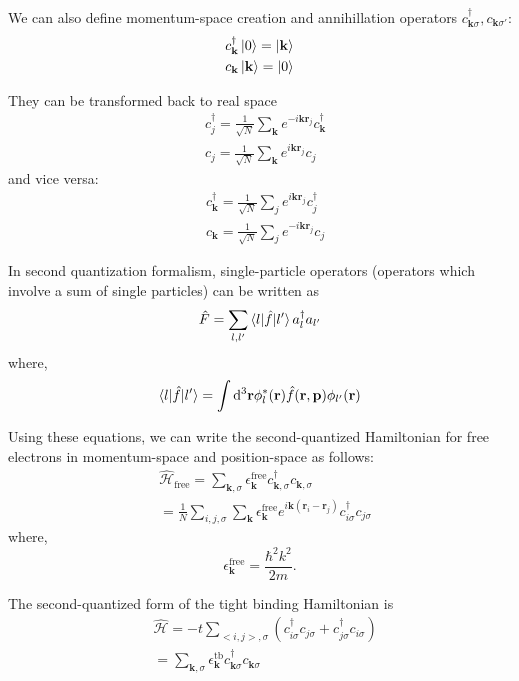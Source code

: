 \documentclass[11pt, a4paper, twocolumn]{article}
\newcommand{\bb}[1]{\mathbf{#1}}
\newcommand{\dd}{\mathrm{d}}
\begin{document}
\par We can also define momentum-space creation and annihillation operators $c^\dagger_{\bb k \sigma},
c_{\bb k \sigma'}$:
\begin{align*}
  &c^\dagger_{\bb k}\ket 0 = \ket {\bb k} \\
  &c_{\bb k}\ket {\bb k} = \ket 0
\end{align*}

They can be transformed back to real space
\begin{align*}
  &c^\dagger_j = \frac{1}{\sqrt N}\sum\limits_{\bb k}e^{-i\bb k \bb r_j}c^\dagger_{\bb k} \\
  &c_j = \frac{1}{\sqrt N}\sum\limits_{\bb k}e^{i\bb k \bb r_j}c_j
\end{align*}
and vice versa:
\begin{align*}
  &c^\dagger_{\bb k} = \frac{1}{\sqrt N}\sum\limits_{j}e^{i\bb k \bb r_j} c^\dagger_j \\
  &c_{\bb k} = \frac{1}{\sqrt N}\sum\limits_{j}e^{-i\bb k \bb r_j} c_j
\end{align*}

In second quantization formalism, single-particle operators (operators which involve a sum of single particles)
can be written as 
\begin{equation*}
  \hat F = \sum\limits_{l,l'} \braket{l | \hat f | l'}a^\dagger_{l}a_{l'}
\end{equation*}
where,
\begin{equation*}
  \braket{l | \hat f | l'} = \int \dd^3\bb r \phi^{*}_{l}(\bb r) \hat f(\bb r, \bb p) \phi_{l'}(\bb r)
\end{equation*}

Using these equations, we can write the second-quantized Hamiltonian for free electrons in 
momentum-space and position-space as follows:
\begin{align*}
  &\hat{\mathcal H}_{\textrm{free}} = \sum\limits_{\bb k, \sigma}\epsilon^{\textrm{free}}_{\bb k} c^\dagger_{\bb k, \sigma}
  c_{\bb k, \sigma} \\
  &=\frac{1}{N}\sum\limits_{i,j,\sigma}\sum\limits_{\bb k} \epsilon^{\textrm{free}}_{\bb k} 
  e^{i \bb k (\bb r_i - \bb r_j)} c^\dagger_{i\sigma}c_{j\sigma}
\end{align*} 
where, 
\begin{equation*}
  \epsilon^{\textrm{free}}_{\bb k} = \frac{\hbar^2k^2}{2m}\text{.}
\end{equation*}

The second-quantized form of the tight binding Hamiltonian is 
\begin{align*}
  &\hat{\mathcal H} = -t \sum\limits_{<i,j>,\sigma} (c^\dagger_{i\sigma}c_{j\sigma} + c^\dagger_{j\sigma}c_{i\sigma})\\
  &=\sum\limits_{\bb k, \sigma} \epsilon^{\textrm{tb}}_{\bb k}c^\dagger_{\bb k\sigma}c_{\bb k \sigma}
\end{align*}
\end{document}
